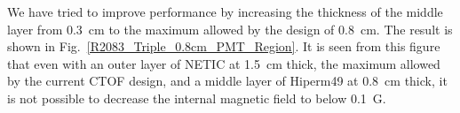 \documentclass[12pt]{article}
\begin{document}
We have tried to  improve  performance  by increasing the thickness 
of the middle layer  from 0.3~cm to the maximum allowed by the design 
of 0.8~cm. The result is shown in  Fig.~\ref{R2083_Triple_0.8cm_PMT_Region}.  It is seen from this figure 
that even with an outer layer of NETIC at 1.5~cm thick,
the maximum allowed by the current CTOF design, and a middle layer 
of Hiperm49 at 0.8~cm thick, it is not possible to decrease the internal
magnetic field to below 0.1~G. 
%
\begin{figure}[ht]
\centering
{}
\qquad
{}
\qquad
{}

\end{figure}
\end{document}
